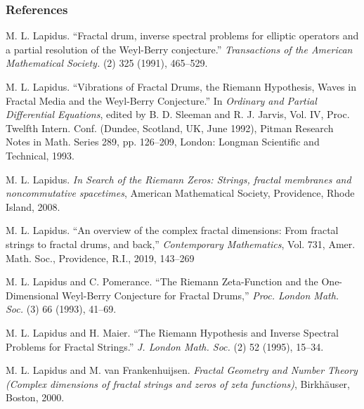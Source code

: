 \documentclass{if-beamer}
\begin{document}
\begin{frame}[allowframebreaks]
\frametitle{References}

\begin{thebibliography}{1}

%

M. L. Lapidus.
``Fractal drum, inverse spectral problems for elliptic operators and a partial resolution of the Weyl-Berry conjecture.'' 
\textit{Transactions of the American Mathematical Society.}
(2)
325
(1991),
465--529.
 
M. L. Lapidus.
``Vibrations of Fractal Drums, the Riemann Hypothesis, Waves in Fractal Media and the Weyl-Berry Conjecture.'' In \textit{Ordinary and Partial Differential Equations}, edited by B. D. Sleeman and R. J. Jarvis, Vol. IV, Proc. Twelfth Intern. Conf. (Dundee, Scotland, UK, June 1992), Pitman Research Notes in Math. Series 289, pp. 126--209, London: Longman Scientific and Technical, 1993.

M. L. Lapidus.
\textit{In Search of the Riemann Zeros: Strings, fractal membranes and noncommutative spacetimes}, 
American Mathematical Society, Providence, Rhode Island, 2008.

M. L. Lapidus.
``An overview of the complex fractal dimensions: From fractal strings to fractal drums, and back,'' \textit{Contemporary Mathematics}, Vol. 731, Amer. Math. Soc., Providence, R.I., 2019, 143--269

M. L. Lapidus and C. Pomerance.
``The Riemann Zeta-Function and the One-Dimensional Weyl-Berry Conjecture for Fractal Drums,''
\textit{Proc. London Math. Soc.}
(3)
66
(1993),
41--69.

M. L. Lapidus and H. Maier.
``The Riemann Hypothesis and Inverse Spectral Problems for Fractal Strings.'' \textit{J. London Math. Soc.}
(2)
52
(1995),
15--34.

M. L. Lapidus and M. van Frankenhuijsen.
\textit{Fractal Geometry and Number Theory \textup(Complex dimensions of fractal strings and zeros of zeta functions\textup)},
Birkh\"auser, Boston, 2000.


\end{thebibliography}
\end{frame}
\end{document}
